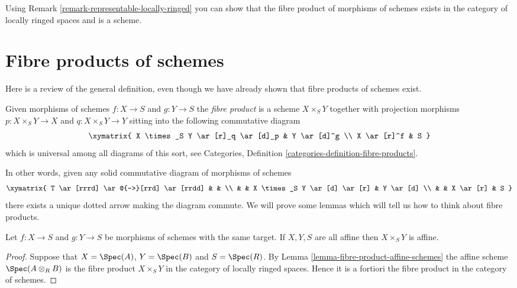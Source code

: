 \begin{remark}
\label{remark-fibre-product-schemes-locally-ringed}
Using Remark \ref{remark-representable-locally-ringed}
you can show that the fibre product of morphisms of schemes
exists in the category of locally ringed spaces and is a
scheme.
\end{remark}




\section{Fibre products of schemes}
\label{section-fibre-products}

\noindent
Here is a review of the general definition, even though
we have already shown that fibre products of schemes exist.

\begin{definition}
\label{definition-fibre-product}
\begin{reference}
\cite[Chapter II, \S 1, no. 33, Propositions 6 and 7,
pp. 225--226, and no. 34, Corollary to Proposition 8, p. 227]{FAC}
\end{reference}
Given morphisms of schemes $f : X \to S$ and $g : Y \to S$
the {\it fibre product} is a scheme $X \times_S Y$ together
with projection morphisms $p : X \times_S Y \to X$
and $q : X \times_S Y \to Y$ sitting into the following
commutative diagram
$$
\xymatrix{
X \times_S Y \ar[r]_q \ar[d]_p & Y \ar[d]^g \\
X \ar[r]^f & S
}
$$
which is universal among all diagrams of this sort,
see Categories, Definition \ref{categories-definition-fibre-products}.
\end{definition}

\noindent
In other words, given any solid commutative diagram of
morphisms of schemes
$$
\xymatrix{
T \ar[rrrd] \ar@{-->}[rrd] \ar[rrdd]
&
&
\\
&
&
X \times_S Y \ar[d] \ar[r]
&
Y \ar[d]
\\
&
&
X \ar[r]
&
S
}
$$
there exists a unique dotted arrow making the diagram commute.
We will prove some lemmas which will tell us how to think about
fibre products.

\begin{lemma}
\label{lemma-fibre-product-affines}
Let $f : X \to S$ and $g : Y \to S$ be morphisms of schemes
with the same target. If $X, Y, S$ are all affine then
$X \times_S Y$ is affine.
\end{lemma}

\begin{proof}
Suppose that $X = \Spec(A)$, $Y = \Spec(B)$
and $S = \Spec(R)$. By Lemma \ref{lemma-fibre-product-affine-schemes}
the affine scheme $\Spec(A \otimes_R B)$
is the fibre product $X \times_S Y$ in the category
of locally ringed spaces. Hence it is a fortiori the
fibre product in the category of schemes.
\end{proof}

